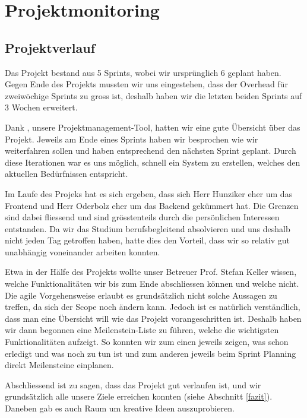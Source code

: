 \chapter{Projektmonitoring}
\label{projektmonitoring}





\section{Projektverlauf}
Das Projekt bestand aus 5 Sprints, wobei wir ursprünglich 6 geplant haben.
Gegen Ende des Projekts mussten wir uns eingestehen, dass der Overhead für zweiwöchige Sprints zu gross ist, deshalb haben wir die letzten beiden Sprints auf 3 Wochen erweitert.

Dank , unsere Projektmanagement-Tool, hatten wir eine gute Übersicht über das Projekt.
Jeweils am Ende eines Sprints haben wir besprochen wie wir weiterfahren sollen und haben entsprechend den nächsten Sprint geplant.
Durch diese Iterationen war es uns möglich, schnell ein System zu erstellen, welches den aktuellen Bedürfnissen entspricht.

Im Laufe des Projeks hat es sich ergeben, dass sich Herr Hunziker eher um das Frontend und Herr Oderbolz eher um das Backend gekümmert hat.
Die Grenzen sind dabei fliessend und sind grösstenteils durch die persönlichen Interessen entstanden.
Da wir das Studium berufsbegleitend absolvieren und uns deshalb nicht jeden Tag getroffen haben, hatte dies den Vorteil, dass wir so relativ gut unabhängig voneinander arbeiten konnten.

Etwa in der Hälfe des Projekts wollte unser Betreuer Prof. Stefan Keller wissen, welche Funktionalitäten wir bis zum Ende abschliessen können und welche nicht.
Die agile Vorgehensweise erlaubt es grundsätzlich nicht solche Aussagen zu treffen, da sich der Scope noch ändern kann.
Jedoch ist es natürlich verständlich, dass man eine Übersicht will wie das Projekt vorangeschritten ist.
Deshalb haben wir dann begonnen eine Meilenstein-Liste zu führen, welche die wichtigsten Funktionalitäten aufzeigt.
So konnten wir zum einen jeweils zeigen, was schon erledigt und was noch zu tun ist und zum anderen jeweils beim Sprint Planning direkt Meilensteine einplanen.

Abschliessend ist zu sagen, dass das Projekt gut verlaufen ist, und wir grundsätzlich alle unsere Ziele erreichen konnten (siehe Abschnitt \ref{fazit}).
Daneben gab es auch Raum um kreative Ideen auszuprobieren.

